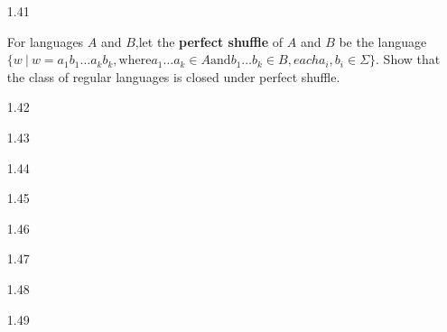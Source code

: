 \begin{enumerate}

    \item [1.41]

    For languages $A$ and $B$,let the \textbf{perfect shuffle} of $A$ and $B$ be the language $\{w~|~ w = a_1b_1\ldots a_kb_k , \text{where} a_1\ldots a_k \in A \text{and} b_1 \ldots b_k \in B, each a_i,b_i \in \Sigma\}$. Show that the class of regular languages is closed under perfect shuffle.

    \item [1.42]
    \item [1.43]
    \item [1.44]
    \item [1.45]
    \item [1.46]
    \item [1.47]
    \item [1.48]
    \item [1.49]

\end{enumerate}

